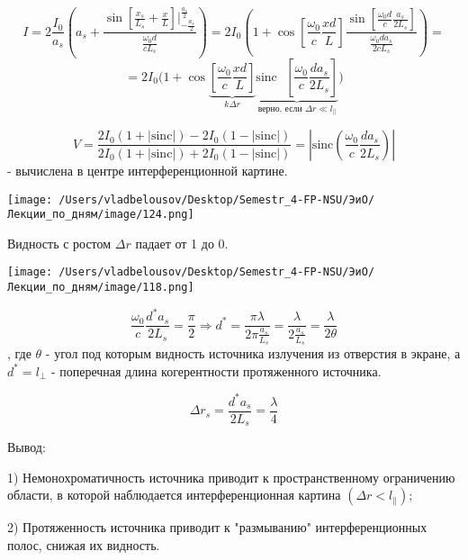 \documentclass[12pt, a4paper]{report}
\begin{document}
\fi


\[ I = 2 \frac{I_0 }{a_s } \left( a_s + \frac{\sin \left[ \frac{x_s}{L_s} + \frac{x}{L }   \right]  \bigg | ^{\frac{a_s}{2 } }_{-\frac{a_s}{2 } } }{\frac{\omega_0 d }{c L_s} }  \right) = 2 I_0 \left( 1  + \cos \left[ \frac{\omega_0}{c } \frac{xd}{L}  \right] \frac{\sin \left[ \frac{\omega_0 d }{c } \frac{a_s }{2 L_s }   \right]}{\frac{\omega_0 d a_s  }{2c L_s} }  \right)  =\] 
\[ = 2 I_0 \bigg( 1 + \cos  \underbrace{\left[ \frac{\omega_0}{c} \frac{x d }{L }   \right]}_{k \Delta r } \underbrace{ \mathrm{sinc } \text{ } \left[ \frac{\omega_0}{c }  \frac{d a_s}{2 L_s}  \right]}_{\text{верно, если } \Delta r \ll l_{\parallel}  } \bigg) \] 

\[ V = \frac{2I_0 (1+ |\mathrm{sinc}|)- 2I_0 (1 - |\mathrm{sinc}  |)}{2 I_0 (1 + |\mathrm{sinc}  |) + 2 I_0 (1 - |\mathrm{sinc}  |)} = \left\lvert \mathrm{sinc }  \left( \frac{\omega_0}{c} \frac{d a_s }{2 L_s}  \right)  \right\rvert   \] 
- вычислена в центре  интерференционной картине.

\begin{center}
    \texttt{[image: /Users/vladbelousov/Desktop/Semestr\_4-FP-NSU/ЭиО/Лекции\_по\_дням/image/124.png]}
\end{center}  
Видность с ростом \( \Delta r  \) падает от 1 до 0.

\begin{center}
    \texttt{[image: /Users/vladbelousov/Desktop/Semestr\_4-FP-NSU/ЭиО/Лекции\_по\_дням/image/118.png]}
\end{center}  

\[ \frac{\omega_0}{c }  \frac{d^* a_s }{2 L_s } = \frac{\pi}{2 }  \Rightarrow d^* = \frac{\pi \lambda }{2 \pi \frac{a_s}{L_s}  } = \frac{\lambda}{2 \frac{a_s}{L_s}  }  = \frac{\lambda}{2 \theta}   \]
, где \( \theta  \) - угол под которым видность источника излучения из отверстия в экране, а \( d^* = l_{\perp } \) - поперечная длина когерентности   протяженного источника.

\[ \Delta r_s = \frac{d^* a_s }{2 L_s} = \frac{\lambda}{4}   \] 

Вывод: 

1) Немонохроматичность источника приводит к пространственному ограничению области, в которой наблюдается интерференционная картина \( (\Delta r < l_{\parallel} ) \);

2) Протяженность источника приводит к "размыванию" интерференционных полос, снижая их видность.
\end{document}
